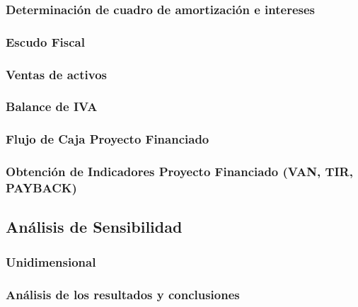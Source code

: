    	\subsubsection{Determinación de cuadro de amortización e intereses}
    	\subsubsection{Escudo Fiscal}
    	\subsubsection{Ventas de activos}
    	\subsubsection{Balance de IVA}
    	\subsubsection{Flujo de Caja Proyecto Financiado}
    	\subsubsection{Obtención de Indicadores Proyecto Financiado (VAN, TIR, PAYBACK)}
    \subsection{Análisis de Sensibilidad}
    	\subsubsection{Unidimensional}
    	\subsubsection{Análisis de los resultados y conclusiones}
    
